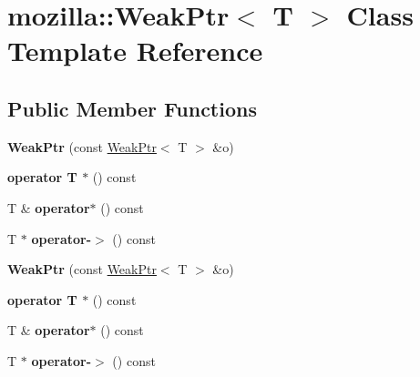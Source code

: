 \hypertarget{classmozilla_1_1_weak_ptr}{\section{mozilla\-:\-:Weak\-Ptr$<$ T $>$ Class Template Reference}
\label{classmozilla_1_1_weak_ptr}
}
\subsection*{Public Member Functions}
\begin{DoxyCompactItemize}
\item 
\hypertarget{classmozilla_1_1_weak_ptr_a963a7ada34b2111c5f06c987afc5b620}{{\bfseries Weak\-Ptr} (const \hyperlink{classmozilla_1_1_weak_ptr}{Weak\-Ptr}$<$ T $>$ \&o)}\label{classmozilla_1_1_weak_ptr_a963a7ada34b2111c5f06c987afc5b620}

\item 
\hypertarget{classmozilla_1_1_weak_ptr_a01414b7b22dd0afc3deb1e10e30c1545}{{\bfseries operator T $\ast$} () const }\label{classmozilla_1_1_weak_ptr_a01414b7b22dd0afc3deb1e10e30c1545}

\item 
\hypertarget{classmozilla_1_1_weak_ptr_ad8bb7bdf5e76baffd7af34aba7c79e5a}{T \& {\bfseries operator$\ast$} () const }\label{classmozilla_1_1_weak_ptr_ad8bb7bdf5e76baffd7af34aba7c79e5a}

\item 
\hypertarget{classmozilla_1_1_weak_ptr_a9cb833fbd719a22752ffaeb26b0212c7}{T $\ast$ {\bfseries operator-\/$>$} () const }\label{classmozilla_1_1_weak_ptr_a9cb833fbd719a22752ffaeb26b0212c7}

\item 
\hypertarget{classmozilla_1_1_weak_ptr_a963a7ada34b2111c5f06c987afc5b620}{{\bfseries Weak\-Ptr} (const \hyperlink{classmozilla_1_1_weak_ptr}{Weak\-Ptr}$<$ T $>$ \&o)}\label{classmozilla_1_1_weak_ptr_a963a7ada34b2111c5f06c987afc5b620}

\item 
\hypertarget{classmozilla_1_1_weak_ptr_a01414b7b22dd0afc3deb1e10e30c1545}{{\bfseries operator T $\ast$} () const }\label{classmozilla_1_1_weak_ptr_a01414b7b22dd0afc3deb1e10e30c1545}

\item 
\hypertarget{classmozilla_1_1_weak_ptr_ad8bb7bdf5e76baffd7af34aba7c79e5a}{T \& {\bfseries operator$\ast$} () const }\label{classmozilla_1_1_weak_ptr_ad8bb7bdf5e76baffd7af34aba7c79e5a}

\item 
\hypertarget{classmozilla_1_1_weak_ptr_a9cb833fbd719a22752ffaeb26b0212c7}{T $\ast$ {\bfseries operator-\/$>$} () const }\label{classmozilla_1_1_weak_ptr_a9cb833fbd719a22752ffaeb26b0212c7}

\end{DoxyCompactItemize}
